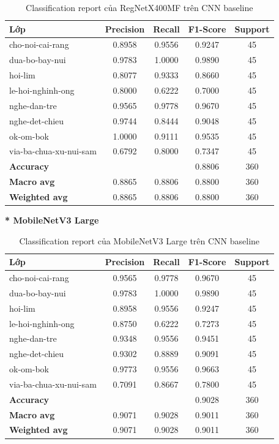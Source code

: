 \begin{table}[H]
\centering
\renewcommand{\arraystretch}{1.0}
\caption{Classification report của RegNetX400MF trên CNN baseline}
\label{tab:CRRegNetX400MF}
\begin{tabular}{lcccc}
\hline
\textbf{Lớp} & \textbf{Precision} & \textbf{Recall} & \textbf{F1-Score} & \textbf{Support} \\
\hline
cho-noi-cai-rang          & 0.8958 & 0.9556 & 0.9247 & 45 \\
dua-bo-bay-nui             & 0.9783 & 1.0000 & 0.9890 & 45 \\
hoi-lim                    & 0.8077 & 0.9333 & 0.8660 & 45 \\
le-hoi-nghinh-ong          & 0.8000 & 0.6222 & 0.7000 & 45 \\
nghe-dan-tre               & 0.9565 & 0.9778 & 0.9670 & 45 \\
nghe-det-chieu             & 0.9744 & 0.8444 & 0.9048 & 45 \\
ok-om-bok                  & 1.0000 & 0.9111 & 0.9535 & 45 \\
via-ba-chua-xu-nui-sam     & 0.6792 & 0.8000 & 0.7347 & 45 \\
\hline
\textbf{Accuracy}          & & & 0.8806 & 360 \\
\textbf{Macro avg}         & 0.8865 & 0.8806 & 0.8800 & 360 \\
\textbf{Weighted avg}      & 0.8865 & 0.8806 & 0.8800 & 360 \\
\hline
\end{tabular}
\end{table}
\textbf{* MobileNetV3 Large}
\begin{table}[H]
\centering
\renewcommand{\arraystretch}{1.0}
\caption{Classification report của MobileNetV3 Large trên CNN baseline}
\label{tab:CRMobileNetV3Large}
\begin{tabular}{lcccc}
\hline
\textbf{Lớp} & \textbf{Precision} & \textbf{Recall} & \textbf{F1-Score} & \textbf{Support} \\
\hline
cho-noi-cai-rang          & 0.9565 & 0.9778 & 0.9670 & 45 \\
dua-bo-bay-nui             & 0.9783 & 1.0000 & 0.9890 & 45 \\
hoi-lim                    & 0.8958 & 0.9556 & 0.9247 & 45 \\
le-hoi-nghinh-ong          & 0.8750 & 0.6222 & 0.7273 & 45 \\
nghe-dan-tre               & 0.9348 & 0.9556 & 0.9451 & 45 \\
nghe-det-chieu             & 0.9302 & 0.8889 & 0.9091 & 45 \\
ok-om-bok                  & 0.9773 & 0.9556 & 0.9663 & 45 \\
via-ba-chua-xu-nui-sam     & 0.7091 & 0.8667 & 0.7800 & 45 \\
\hline
\textbf{Accuracy}          & & & 0.9028 & 360 \\
\textbf{Macro avg}         & 0.9071 & 0.9028 & 0.9011 & 360 \\
\textbf{Weighted avg}      & 0.9071 & 0.9028 & 0.9011 & 360 \\
\hline
\end{tabular}
\end{table}
